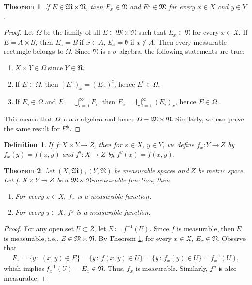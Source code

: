 \documentclass[11pt]{book}
\newtheorem{definition}{Definition}[chapter]
\newtheorem{theorem}{Theorem}[chapter]
\theoremstyle{definition}
\numberwithin{equation}{chapter}
\begin{document}
\begin{theorem}\label{theorem_31}
If $E \in \mathfrak{M} \times \mathfrak{N}$, then $E_x \in \mathfrak{N}$ and $E^y \in \mathfrak{M}$ for every $x \in X$ and $y \in Y$.
\end{theorem}
\begin{proof}
Let $\Omega$ be the family of all $E \in \mathfrak{M} \times \mathfrak{N}$ such that $E_x \in \mathfrak{N}$ for every $x \in X$. If $E = A \times B$, then $E_x = B$ if $x \in A$, $E_x = \emptyset$ if $x \notin A$. Then every measurable rectangle belongs to $\Omega$. Since $\mathfrak{N}$ is a $\sigma$-algebra, the following statements are true:
\begin{enumerate}[label=(\alph*)]
    \item $X \times Y \in \Omega$ since $Y \in \mathfrak{N}$.
    
    \item If $E \in \Omega$, then $(E^c)_x = (E_x)^c$, hence $E^c \in \Omega$.
    
    \item If $E_i \in \Omega$ and $E = \bigcup^\infty_{i=1} E_i$, then $E_x = \bigcup^\infty_{i=1} (E_i)_x$, hence $E \in \Omega$.
\end{enumerate}
This means that $\Omega$ is a $\sigma$-algebra and hence $\Omega = \mathfrak{M} \times \mathfrak{N}$. Similarly, we can prove the same result for $E^y$.
\end{proof}

\medskip

\begin{definition}
If $f: X \times Y \to Z$, then for $x \in X$, $y \in Y$, we define $f_x: Y \to Z$ by $f_x(y) = f(x,y)$ and $f^y: X \to Z$ by $f^y(x) = f(x,y)$.
\end{definition}

\medskip

\begin{theorem}\label{theorem_32}
Let $(X,\mathfrak{M}), (Y,\mathfrak{N})$ be measurable spaces and $Z$ be metric space. Let $f:X \times Y \to Z$ be a $\mathfrak{M} \times \mathfrak{N}$-measurable function, then
\begin{enumerate}[label=(\alph*)]
    \item For every $x \in X$, $f_x$ is a measurable function.
    
    \item For every $y \in X$, $f^y$ is a measurable function.
\end{enumerate}
\end{theorem}
\begin{proof}
For any open set $U \subset Z$, let $E \coloneqq f^{-1}(U)$. Since $f$ is measurable, then $E$ is measurable, i.e., $E \in \mathfrak{M} \times \mathfrak{N}$. By Theorem \ref{theorem_31}, for every $x \in X$, $E_x \in \mathfrak{N}$. Observe that
\begin{align*}
    E_x = \{y \,:\, (x,y) \in E \} = \{y \,:\, f(x,y) \in U \} = \{y \,:\, f_x(y) \in U \} = f_x^{-1}(U),
\end{align*}
which implies $f_x^{-1}(U) = E_x \in \mathfrak{N}$. Thus, $f_x$ is measurable. Similarly, $f^y$ is also measurable.
\end{proof}
\end{document}
